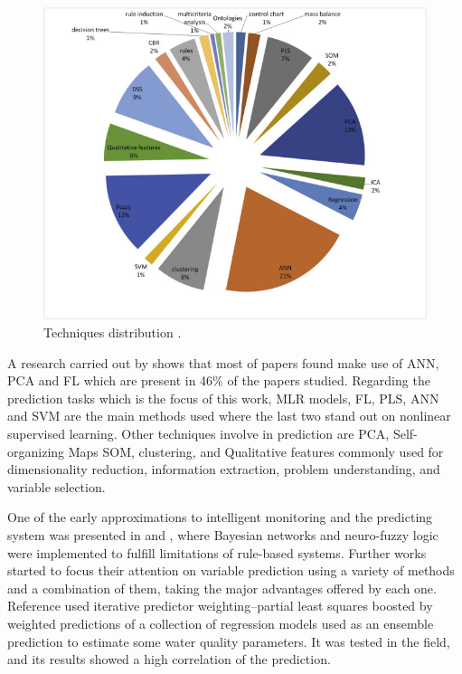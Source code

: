 \begin{figure}[t]
\centering
\includegraphics[width=15cm]{figures/3-Distribution-of-papers.jpg}
\caption{Techniques distribution \cite{Corominas2018}.}
\label{f:Techniques-Distribution}
\end{figure}

A research carried out by \cite{Corominas2018} shows that most of papers found make use of \ac{ANN}, \ac{PCA} and \ac{FL} which are present in 46\% of the papers studied. Regarding the prediction tasks which is the focus of this work, \ac{MLR} models, \ac{FL}, \ac{PLS}, \ac{ANN} and \ac{SVM} are the main methods used where the last two stand out on nonlinear supervised learning. Other techniques involve in prediction are \ac{PCA}, Self-organizing Maps \ac{SOM}, clustering, and Qualitative features commonly used for dimensionality reduction, information extraction, problem understanding, and variable selection.

One of the early approximations to intelligent monitoring and the predicting system was presented in \cite{Sanguesa2000} and \cite{Haggege2005}, where Bayesian networks and neuro-fuzzy logic were implemented to fulfill limitations of rule-based systems. Further works started to focus their attention on variable prediction using a variety of methods and a combination of them, taking the major advantages offered by each one. Reference \cite{Qin2012} used iterative predictor weighting–partial least squares boosted by weighted predictions of a collection of regression models used as an ensemble prediction to estimate some water quality parameters. It was tested in the field, and its results showed a high correlation of the prediction. 

